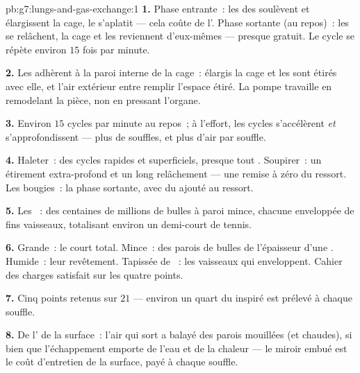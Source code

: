 \begin{solution}{pb:g7:lungs-and-gas-exchange:1}
\textbf{1.} Phase entrante~: les  des  soulèvent et
élargissent la cage, le  s'aplatit --- cela coûte de
l'. Phase sortante (au repos)~: les  se relâchent, la
cage et les  reviennent d'eux-mêmes --- presque gratuit. Le
cycle se répète environ $15$ fois par minute.

\textbf{2.} Les  adhèrent à la paroi interne de la cage~:
élargis la cage et les  sont étirés avec elle, et l'air
extérieur entre remplir l'espace étiré. La pompe travaille en
remodelant la pièce, non en pressant l'organe.

\textbf{3.} Environ $15$ cycles par minute au repos~; à l'effort,
les cycles s'accélèrent \emph{et} s'approfondissent --- plus de
souffles, et plus d'air par souffle.

\textbf{4.} Haleter~: des cycles rapides et superficiels, presque
tout . Soupirer~: un étirement extra-profond et un long
relâchement --- une remise à zéro du ressort. Les bougies~: la phase
sortante, avec du  ajouté au ressort.

\textbf{5.} Les ~: des centaines de millions de bulles à
paroi mince, chacune enveloppée de fins vaisseaux, totalisant
environ un demi-court de tennis.

\textbf{6.} Grande~: le court total. Mince~: des parois de bulles de
l'épaisseur d'une . Humide~: leur revêtement. Tapissée de
~: les vaisseaux qui enveloppent. Cahier des charges satisfait
sur les quatre points.

\textbf{7.} Cinq points retenus sur $21$ --- environ un quart du
 inspiré est prélevé à chaque souffle.

\textbf{8.} De l' de la surface~: l'air qui sort a balayé
des parois mouillées (et chaudes), si bien que l'échappement emporte
de l'eau et de la chaleur --- le miroir embué est le coût
d'entretien de la surface, payé à chaque souffle.


\end{solution}
